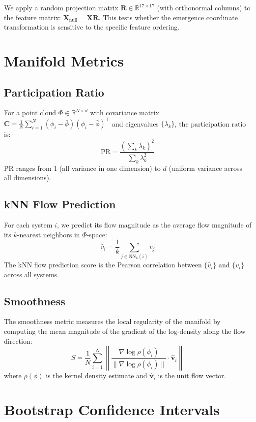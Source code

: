 \documentclass[10pt]{article}
\begin{document}
We apply a random projection matrix $\mathbf{R} \in \mathbb{R}^{17 \times 17}$ (with orthonormal columns) to the feature matrix: $\mathbf{X}_{\text{null}} = \mathbf{X} \mathbf{R}$. This tests whether the emergence coordinate transformation is sensitive to the specific feature ordering.

\section{Manifold Metrics}
\label{sec:metrics}

\subsection{Participation Ratio}

For a point cloud $\Phi \in \mathbb{R}^{N \times d}$ with covariance matrix $\mathbf{C} = \frac{1}{N} \sum_{i=1}^N (\phi_i - \bar{\phi})(\phi_i - \bar{\phi})^\top$ and eigenvalues $\{\lambda_k\}$, the participation ratio is:
\[
\text{PR} = \frac{(\sum_k \lambda_k)^2}{\sum_k \lambda_k^2}
\]
PR ranges from 1 (all variance in one dimension) to $d$ (uniform variance across all dimensions).

\subsection{kNN Flow Prediction}

For each system $i$, we predict its flow magnitude as the average flow magnitude of its $k$-nearest neighbors in $\Phi$-space:
\[
\hat{v}_i = \frac{1}{k} \sum_{j \in \text{NN}_k(i)} v_j
\]
The kNN flow prediction score is the Pearson correlation between $\{\hat{v}_i\}$ and $\{v_i\}$ across all systems.

\subsection{Smoothness}

The smoothness metric measures the local regularity of the manifold by computing the mean magnitude of the gradient of the log-density along the flow direction:
\[
S = \frac{1}{N} \sum_{i=1}^N \left\| \frac{\nabla \log \rho(\phi_i)}{\|\nabla \log \rho(\phi_i)\|} \cdot \hat{\mathbf{v}}_i \right\|
\]
where $\rho(\phi)$ is the kernel density estimate and $\hat{\mathbf{v}}_i$ is the unit flow vector.

\section{Bootstrap Confidence Intervals}
\label{sec:bootstrap}
\end{document}
